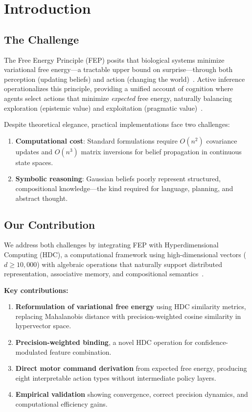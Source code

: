 \documentclass[10pt,letterpaper]{article}
\begin{document}
\section{Introduction}

\subsection{The Challenge}

The Free Energy Principle (FEP) posits that biological systems minimize variational free energy---a tractable upper bound on surprise---through both perception (updating beliefs) and action (changing the world)~\cite{friston2010free}.
Active inference operationalizes this principle, providing a unified account of cognition where agents select actions that minimize \emph{expected} free energy, naturally balancing exploration (epistemic value) and exploitation (pragmatic value)~\cite{friston2017active}.

Despite theoretical elegance, practical implementations face two challenges:
\begin{enumerate}[nosep]
  \item \textbf{Computational cost}: Standard formulations require $O(n^2)$ covariance updates and $O(n^3)$ matrix inversions for belief propagation in continuous state spaces.
  \item \textbf{Symbolic reasoning}: Gaussian beliefs poorly represent structured, compositional knowledge---the kind required for language, planning, and abstract thought.
\end{enumerate}

\subsection{Our Contribution}

We address both challenges by integrating FEP with Hyperdimensional Computing (HDC), a computational framework using high-dimensional vectors ($d \geq 10{,}000$) with algebraic operations that naturally support distributed representation, associative memory, and compositional semantics~\cite{kanerva2009hyperdimensional}.

\textbf{Key contributions:}
\begin{enumerate}[nosep]
  \item \textbf{Reformulation of variational free energy} using HDC similarity metrics, replacing Mahalanobis distance with precision-weighted cosine similarity in hypervector space.
  \item \textbf{Precision-weighted binding}, a novel HDC operation for confidence-modulated feature combination.
  \item \textbf{Direct motor command derivation} from expected free energy, producing eight interpretable action types without intermediate policy layers.
  \item \textbf{Empirical validation} showing convergence, correct precision dynamics, and computational efficiency gains.
\end{enumerate}
\end{document}
